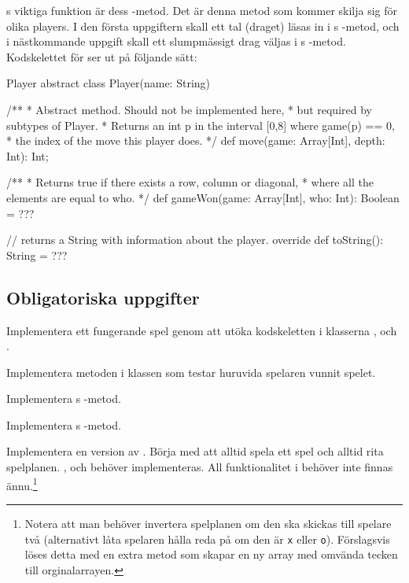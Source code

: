 s viktiga funktion är dess -metod. Det är denna metod som kommer skilja sig för olika players. I den första uppgiftern skall ett tal (draget) läsas in i s -metod, och i nästkommande uppgift skall ett slumpmässigt drag väljas i s -metod.
Kodskelettet för  ser ut på följande sätt:
\begin{ScalaSpec}{Player}
abstract class Player(name: String) {

	/**
	 * Abstract method. Should not be implemented here,
	 * but required by subtypes of Player.
	 * Returns an int p in the interval [0,8] where game(p) == 0,
	 * the index of the move this player does.
	 */
	def move(game: Array[Int], depth: Int): Int;

	/**
	 * Returns true if there exists a row, column or diagonal,
	 * where all the elements are equal to who.
	 */
	def gameWon(game: Array[Int], who: Int): Boolean = ???

	// returns a String with information about the player.
	override def toString(): String = ???
}
\end{ScalaSpec}


\subsection{Obligatoriska uppgifter}

\Task Implementera ett fungerande spel genom att utöka kodskeletten i klasserna ,  och .

\Subtask Implementera metoden  i klassen  som testar huruvida spelaren  vunnit spelet.

\Subtask Implementera s -metod.

\Subtask Implementera s -metod.

\Subtask Implementera en version av . Börja med att alltid spela ett spel och alltid rita spelplanen. ,  och  behöver implementeras. All funktionalitet i  behöver inte finnas ännu.\footnote{Notera att man behöver invertera spelplanen om den ska skickas till spelare två (alternativt låta spelaren hålla reda på om den är \texttt{x} eller \texttt{o}). Förslagsvis löses detta med en extra metod  som skapar en ny array med omvända tecken till orginalarrayen.}

\Task {}


